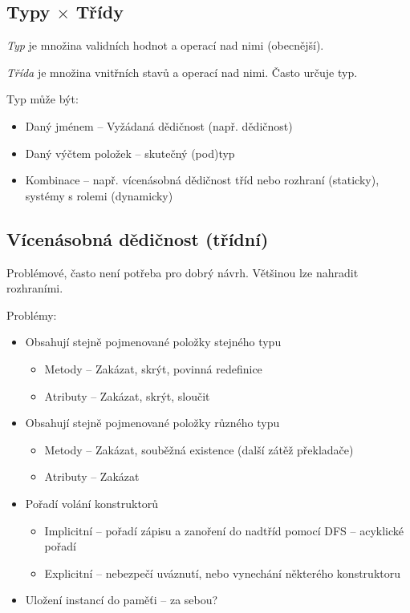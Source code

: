 \documentclass[a4paper, 11pt]{report}
\begin{document}
\subsection{Typy $\times$ Třídy}

\emph{Typ} je množina validních hodnot a operací nad nimi (obecnější).

\emph{Třída} je množina vnitřních stavů a operací nad nimi. Často určuje typ.

Typ může být:
\begin{itemize}
	\item Daný jménem -- Vyžádaná dědičnost (např. dědičnost)
	\item Daný výčtem položek -- skutečný (pod)typ
	\item Kombinace -- např. vícenásobná dědičnost tříd nebo rozhraní (staticky), systémy s rolemi (dynamicky)
\end{itemize}

\subsection{Vícenásobná dědičnost (třídní)}

Problémové, často není potřeba pro dobrý návrh. Většinou lze nahradit rozhraními.

Problémy:
\begin{itemize}
	\item Obsahují stejně pojmenované položky stejného typu
	\begin{itemize}
		\item Metody -- Zakázat, skrýt, povinná redefinice
		\item Atributy -- Zakázat, skrýt, sloučit
	\end{itemize}
	\item Obsahují stejně pojmenované položky různého typu
	\begin{itemize}
		\item Metody -- Zakázat, souběžná existence (další zátěž překladače)
		\item Atributy -- Zakázat
	\end{itemize}
	\item Pořadí volání konstruktorů
	\begin{itemize}
		\item Implicitní -- pořadí zápisu a zanoření do nadtříd pomocí DFS -- acyklické pořadí
		\item Explicitní -- nebezpečí uváznutí, nebo vynechání některého konstruktoru
	\end{itemize}
	\item Uložení instancí do paměťi -- za sebou?
\end{itemize}
\end{document}
